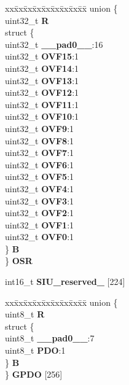 \begin{DoxyCompactItemize}
\begin{tabbing}
\end{tabbing}\item 
\mbox{\label{structSIU__tag_a64b225ef8a743f70da812839f8d4ac70}} 
\begin{tabbing}
xx\=xx\=xx\=xx\=xx\=xx\=xx\=xx\=xx\=\kill
union \{\\
\>uint32\_t {\bfseries R}\\
\>struct \{\\
\>\>uint32\_t {\bfseries \_\_pad0\_\_}:16\\
\>\>uint32\_t {\bfseries OVF15}:1\\
\>\>uint32\_t {\bfseries OVF14}:1\\
\>\>uint32\_t {\bfseries OVF13}:1\\
\>\>uint32\_t {\bfseries OVF12}:1\\
\>\>uint32\_t {\bfseries OVF11}:1\\
\>\>uint32\_t {\bfseries OVF10}:1\\
\>\>uint32\_t {\bfseries OVF9}:1\\
\>\>uint32\_t {\bfseries OVF8}:1\\
\>\>uint32\_t {\bfseries OVF7}:1\\
\>\>uint32\_t {\bfseries OVF6}:1\\
\>\>uint32\_t {\bfseries OVF5}:1\\
\>\>uint32\_t {\bfseries OVF4}:1\\
\>\>uint32\_t {\bfseries OVF3}:1\\
\>\>uint32\_t {\bfseries OVF2}:1\\
\>\>uint32\_t {\bfseries OVF1}:1\\
\>\>uint32\_t {\bfseries OVF0}:1\\
\>\} {\bfseries B}\\
\} {\bfseries OSR}\\

\end{tabbing}\item 
\mbox{\label{structSIU__tag_ad9b6f4046b9f1f7d3912e5f7cb47b5f1}} 
int16\+\_\+t {\bfseries S\+I\+U\+\_\+reserved\+\_} \mbox{[}224\mbox{]}
\item 
\mbox{\label{structSIU__tag_a353e3bea8495c050994dffdf92600e4c}} 
\begin{tabbing}
xx\=xx\=xx\=xx\=xx\=xx\=xx\=xx\=xx\=\kill
union \{\\
\>uint8\_t {\bfseries R}\\
\>struct \{\\
\>\>uint8\_t {\bfseries \_\_pad0\_\_}:7\\
\>\>uint8\_t {\bfseries PDO}:1\\
\>\} {\bfseries B}\\
\} {\bfseries GPDO} \mbox{[}256\mbox{]}\\


\end{tabbing}
\end{DoxyCompactItemize}
